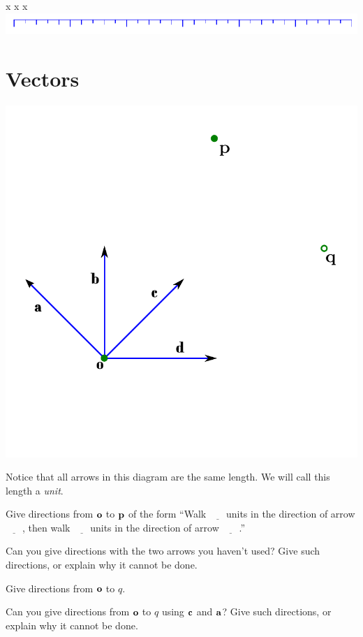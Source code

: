 \documentclass{article}
\newcommand{\ul}{$\underline{\phantom{xxx}}$}
\begin{document}
\newpage
x
\newpage
x
\newpage
x
\newpage
	\includegraphics{ruler.pdf}
\section*{Vectors}

	\includegraphics{vectors-graphically.pdf}

	Notice that all arrows in this diagram are the same length.
	We will call this length a \emph{unit}.
	\begin{Enum}
		\item Give directions from $\bf o$ to $\bf p$ of
		the form ``Walk \ul units in the direction of arrow \ul, then 
		walk \ul units in the direction of arrow \ul.''

		\item Can you give directions with the two arrows you haven't
		used?  Give such directions, or explain why it cannot be done.

		\item Give directions from $\bf o$ to $q$.

		\item Can you give directions from $\bf o$ to $q$ using $\bf c$ and $\bf a$?
		Give such directions, or explain why it cannot be done.

	\end{Enum}
\end{document}
